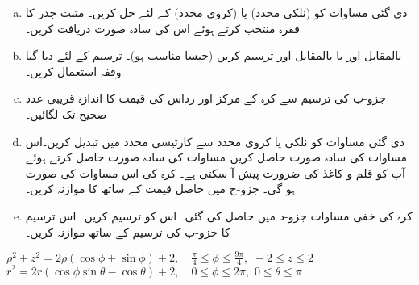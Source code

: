 \begin{enumerate}[a.]
\item
دی گئی مساوات کو  (نلکی محدد)   یا   (کروی محدد) کے لئے حل کریں۔ مثبت  جذر کا فقرہ منتخب کرتے ہوئے  اس کی سادہ صورت دریافت کریں۔
\item
{} بالمقابل  اور  یا  بالمقابل  اور  ترسیم کریں (جیسا مناسب ہو)۔ ترسیم کے لئے دیا گیا وقفہ استعمال کریں۔
\item
جزو-ب  کی ترسیم سے کرہ کے  مرکز اور رداس کی قیمت کا اندازہ قریبی عدد صحیح  تک   لگائیں۔
\item
دی گئی مساوات کو نلکی یا کروی محدد سے کارتیسی محدد میں تبدیل کریں۔اس مساوات کی سادہ صورت حاصل کریں۔مساوات کی سادہ صورت حاصل کرتے ہوئے آپ کو قلم و کاغذ کی ضرورت پیش آ سکتی ہے۔ کرہ کی اس مساوات کی صورت
  ہو گی۔   جزو-ج میں حاصل قیمت کے ساتھ  کا موازنہ کریں۔
\item
کرہ کی خفی مساوات جزو-د میں حاصل کی گئی۔ اس کو ترسیم کریں۔ اس ترسیم کا جزو-ب کی ترسیم کے ساتھ موازنہ کریں۔
\end{enumerate}
$\rho^2+z^2=2\rho(\cos\phi+\sin\phi)+2,\quad \frac{\pi}{4}\le\phi\le\frac{9\pi}{4},\,\, -2\le z\le 2$
$r^2=2r(\cos\phi\sin\theta-\cos\theta)+2,\quad 0\le \phi\le 2\pi,\,\,0\le\theta\le \pi$



